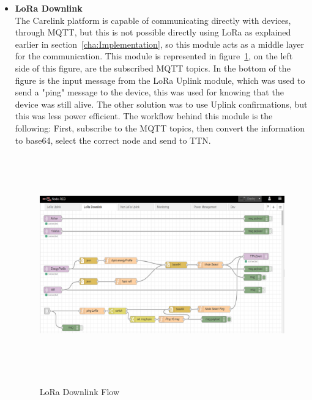 \begin{itemize}
   \item \textbf{LoRa Downlink} \\
   The Carelink platform is capable of  communicating directly with devices, through MQTT, but this is not possible directly using LoRa as explained earlier in section~\ref{cha:Implementation}, so this module acts as a middle layer for the communication. This module is represented in figure~\ref{fig:LoRa_Downlink}, on the left side of this figure, are the subscribed MQTT topics. In the bottom of the figure is the input message from the LoRa Uplink module, which was used to send a "ping" message to the device, this was used for knowing that the device was still alive. The other solution was to use Uplink confirmations, but this was less power efficient. The workflow behind this module is the following: First, subscribe to the MQTT topics, then convert the information to base64, select the correct node and send to TTN.\newline\newline\newline\newline
   
     \begin{figure}[htbp]
      \centering
      
        {\includegraphics[height=9.5cm,width=0.9\linewidth]{Chapters/Figures/LoRaDown.pdf}}
     
      \caption{LoRa Downlink Flow}
      \label{fig:LoRa_Downlink}
    \end{figure}
\end{itemize}


